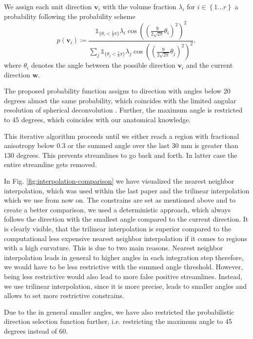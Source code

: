 We assign each unit direction $\mathbf{v}_i$ with the volume fraction
$\lambda_i$ for $i \in \left\{ 1\dots r \right\}$ a probability following the probability
scheme 
\[
	p \left( \mathbf{v}_i \right) \coloneqq \frac{ \mathbb{1}_{\lbrace\theta_i <
		\frac{1}{3} \pi \rbrace} \lambda_i \cos \left( \left( \frac{9}{2\sqrt{2
\pi}} \theta_i \right)^2 \right)^2}{\sum_j \mathbb{1}_{\lbrace\theta_j <
		\frac{1}{3} \pi \rbrace} \lambda_j \cos \left( \left( \frac{9}{2\sqrt{2
\pi}} \theta_j \right)^2 \right)^2 }, 
\]
where $\theta_i$ denotes the angle between the possible direction $\mathbf{v}_i$
and the current direction $\mathbf{w}$. 

The proposed probability function assigns to direction with angles below 20 degrees almost the
same probability, which coincides with the limited angular resolution of
spherical deconvolution \cite{TOURNIER20071459}. Further, the maximum angle is
restricted to $45$ degrees, which coincides with our anatomical knowledge.

This iterative algorithm proceeds until we either reach a region with fractional
anisotropy below $0.3$ or the summed angle over the last $30$ mm is greater than
$130$ degrees. This prevents streamlines to go back and forth. In latter case
the entire streamline gets removed. 

In Fig. \ref{fig:interpolation-comparison} we have visualized the nearest
neighbor interpolation, which was used within the last paper and the trilinear
interpolation which we use from now on. The constrains are set as mentioned
above and to create a better comparison, we used a deterministic approach, which
always follows the direction with the smallest angle compared to the current
direction. It is clearly visible, that the trilinear interpolation is superior
compared to the computational less expensive nearest neighbor interpolation if it comes to
regions with a high curvature. This is due to two main reasons. Nearest neighbor
interpolation leads in general to higher angles in each integration step
therefore, we would have to be less restrictive with the summed angle threshold.
However, being less restrictive would also lead to more false positive
streamlines. Instead, we use trilinear interpolation, since it is more precise,
leads to smaller angles and allows to set more restrictive constrains. 

Due to the in general smaller angles, we have also restricted the 
probabilistic direction selection function further, i.e. restricting
the maximum angle to 45 degrees instead of 60.  


